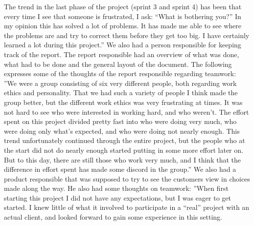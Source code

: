 \newline
\newline
The trend in the last phase of the project (sprint 3 and sprint 4) has been that every time I see that someone is frustrated, I ask: “What is bothering you?” In my opinion this has solved a lot of problems. It has made me able to see where the problems are and try to correct them before they get too big. I have certainly learned a lot during this project.''
\newline
\newline
We also had a person responsible for keeping track of the report. The report responsible had an overview of what was done, what had to be done and the general layout of the document. The following expresses some of the thoughts of the report responsible regarding teamwork:
\newline
\newline
''We were a group consisting of six very different people, both regarding work ethics and personality. That we had such a variety of people I think made the group better, but the different work ethics was very frustrating at times. It was not hard to see who were interested in working hard, and who weren’t. The effort spent on this project divided pretty fast into who were doing very much, who were doing only what’s expected, and who were doing not nearly enough. This trend unfortunately continued through the entire project, but the people who at the start did not do nearly enough started putting in some more effort later on. But to this day, there are still those who work very much, and I think that the difference in effort spent has made some discord in the group.''
\newline
\newline
We also had a product responsible that was supposed to try to see the customers view in choices made along the way. He also had some thoughts on teamwork:
\newline
\newline
''When first starting this project I did not have any expectations, but I was eager to get started. I knew little of what it involved to participate in a “real” project with an actual client, and looked forward to gain some experience in this setting.

